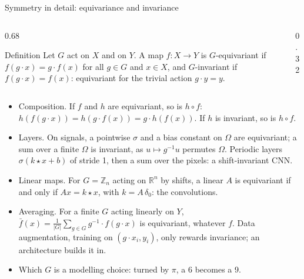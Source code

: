 \documentclass[10pt]{beamer}
\newcommand{\R}{\mathbb{R}}
\begin{document}
\begin{frame}{Symmetry in detail: equivariance and invariance}
\footnotesize
\begin{columns}[c]
\begin{column}{0.68\textwidth}
\begin{mathbox}{Definition}
Let $G$ act on $X$ and on $Y$. A map $f:X\to Y$ is \mbox{\alert{$G$-equivariant}} if $f(g\cdot x)=g\cdot f(x)$ for all $g\in G$ and $x\in X$, and \mbox{\alert{$G$-invariant}} if $f(g\cdot x)=f(x)$: equivariant for the trivial action $g\cdot y=y$.
\end{mathbox}
\end{column}
\begin{column}{0.32\textwidth}
\centering
{}
\end{column}
\end{columns}
\begin{itemize}
\item \alert{Composition.} If $f$ and $h$ are equivariant, so is $h\circ f$: $h(f(g\cdot x))=h(g\cdot f(x))=g\cdot h(f(x))$. If $h$ is invariant, so is $h\circ f$.
\item \alert{Layers.} On signals, a pointwise $\sigma$ and a bias constant on $\Omega$ are equivariant; a sum over a finite $\Omega$ is invariant, as $u\mapsto g^{-1}u$ permutes $\Omega$. Periodic layers $\sigma(k\star x+b)$ of stride 1, then a sum over the pixels: a shift-invariant CNN.
\item \alert{Linear maps.} For $G=\mathbb Z_n$ acting on $\R^n$ by shifts, a linear $A$ is equivariant if and only if $Ax=k\star x$, with $k=A\,\delta_0$: the convolutions.
\item \alert{Averaging.} For a finite $G$ acting linearly on $Y$, $\bar f(x)=\frac1{|G|}\sum_{g\in G}g^{-1}\cdot f(g\cdot x)$ is equivariant, whatever $f$. Data augmentation, training on $(g\cdot x_i,y_i)$, only rewards invariance; an architecture builds it in.
\item \alert{Which $G$} is a modelling choice: turned by $\pi$, a 6 becomes a 9.
\end{itemize}
\end{frame}
\end{document}
